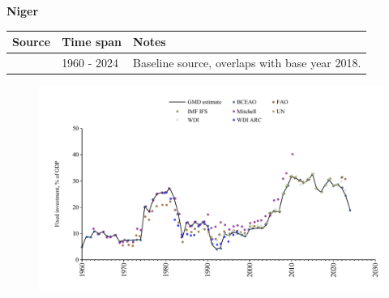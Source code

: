 \documentclass[12pt,a4paper,landscape]{article}
\begin{document}
\begin{adjustbox}{max totalsize={\paperwidth}{\paperheight},center}
\begin{minipage}[t][\textheight][t]{\textwidth}
\vspace*{0.5cm}
{}
\begin{center}
{\Large\bfseries Niger}
\end{center}
\vspace{0.5cm}
\begin{table}[H]
\centering
\small
\begin{tabular}{|l|l|l|}
\hline
\textbf{Source} & \textbf{Time span} & \textbf{Notes} \\
\hline
\rowcolor{white}\cite{BCEAO}& 1960 - 2024 &Baseline source, overlaps with base year 2018.\\
\hline
\end{tabular}
\end{table}
\begin{figure}[H]
\centering
\includegraphics[width=\textwidth,height=0.6\textheight,keepaspectratio]{graphs/NER_finv_GDP.pdf}
\end{figure}
\end{minipage}
\end{adjustbox}
\end{document}
